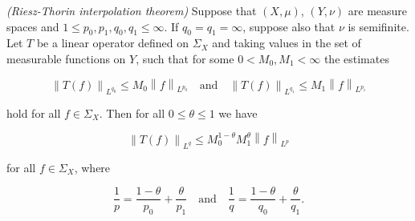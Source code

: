 \begin{mdframed}
	\begin{theorem}\emph{(Riesz-Thorin interpolation theorem)}
		Suppose that $(X,\mu)$, $(Y,\nu)$ are measure spaces and $1 \leq p_0,p_1,q_0,q_1 \leq \infty$. If $q_0 = q_1 = \infty$, suppose also that $\nu$ is semifinite. Let $T$ be a linear operator defined on $\Sigma_X$ and taking values in the set of measurable functions on $Y$, such that for some $0 < M_0,M_1 < \infty$ the estimates 

		\begin{equation}
			\left\|T(f)\right\|_{L^{q_0}} \leq M_0\left\|f\right\|_{L^{p_0}} \quad \text{and} \quad \left\|T(f)\right\|_{L^{q_1}} \leq M_1\left\|f\right\|_{L^{p_1}}
			\label{hyp:Lq0Lq1}
		\end{equation}

		\noindent hold for all $f \in \Sigma_X$. Then for all $0 \leq \theta \leq 1$ we have

		\begin{equation}
			\left\|T(f)\right\|_{L^q} \leq M_0^{1 - \theta}M_1^\theta\left\|f\right\|_{L^p}
			\label{est:boundTf}
		\end{equation}

		\noindent for all $f \in \Sigma_X$, where

		\begin{equation*}
			\frac{1}{p} = \frac{1 - \theta}{p_0} + \frac{\theta}{p_1} \quad \text{and} \quad \frac{1}{q} = \frac{1 - \theta}{q_0} + \frac{\theta}{q_1}.
		\end{equation*}
		\label{thm:Riesz_Thorin}
	\end{theorem}
\end{mdframed}

